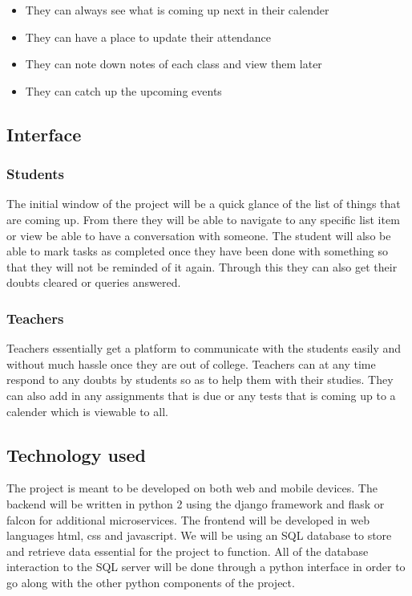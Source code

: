\documentclass{article}
\begin{document}
\begin{itemize}
\item They can always see what is coming up next in their calender
\item They can have a place to update their attendance 
\item They can note down notes of each class and view them later
\item They can catch up the upcoming events
\end{itemize}
\subsection{Interface}

\subsubsection{Students}

The initial window of the project will be a quick glance of the list of things that are coming up. From there they will be able to navigate to any specific list item or view be able to have a conversation with someone. The student will also be able to mark tasks as completed once they have been done with something so that they will not be reminded of it again. Through this they can also get their doubts cleared or queries answered.

\subsubsection{Teachers}

Teachers essentially get a platform to communicate with the students easily and without much hassle once they are out of college. Teachers can at any time respond to any doubts by students so as to help them with their studies. They can also add in any assignments that is due or any tests that is coming up to a calender which is viewable to all.

\subsection{Technology used}

The project is meant to be developed on both web and mobile devices. The backend will be written in python 2 using the django framework and flask or falcon for additional microservices. The frontend will be developed in web languages html, css and javascript. We will be using an SQL database to store and retrieve data essential for the project to function. All of the database interaction to the SQL server will be done through a python interface in order to go along with the other python components of the project.
\end{document}
